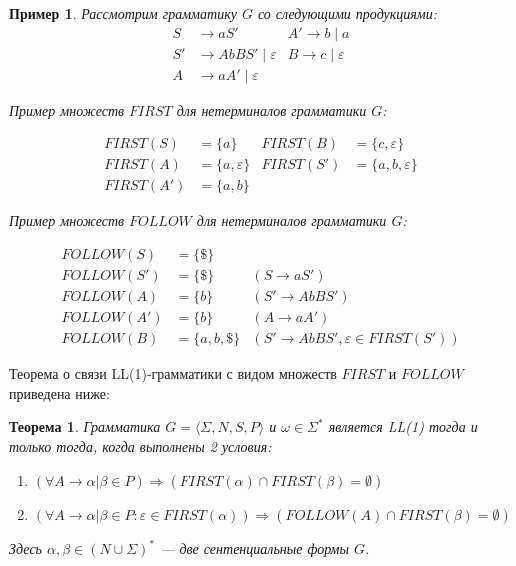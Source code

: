 \documentclass[10pt]{article}         %
\newtheorem{example}{Пример}
\newtheorem{theorem}{Теорема}
\begin{document}
	\begin{example}
		
		Рассмотрим грамматику $G$ со следующими продукциями:
		\begin{align*}
			S  &\to a S' & A' \to b \mid a \\
			S' &\to A b B S' \mid \varepsilon &  B  \to c \mid \varepsilon\\
			A  &\to a A' \mid \varepsilon 
		\end{align*}
		
		
		Пример множеств $FIRST$ для нетерминалов грамматики $G$:
		
		\begin{multicols}{2}
			
			\columnbreak
			
			\begin{align*}
				FIRST(S)  &= \{ a \}  & FIRST(B)  &= \{ c, \varepsilon \} \\
				FIRST(A)  &= \{ a, \varepsilon \} & FIRST(S') &= \{ a, b, \varepsilon \}\\
				FIRST(A') &= \{ a, b \}   
			\end{align*}
		\end{multicols}
		
		Пример множеств $FOLLOW$ для нетерминалов грамматики $G$:
		
		\begin{align*}
			FOLLOW(S)  &= \{ \$ \} & \\
			FOLLOW(S') &= \{ \$ \} &(S \to a S')\\
			FOLLOW(A)  &= \{ b \}  &(S' \to A b B S') \\
			FOLLOW(A') &= \{ b \}  &(A \to a A')\\
			FOLLOW(B)  &= \{ a, b, \$ \} &(S' \to A b B S', \varepsilon \in FIRST(S'))
		\end{align*}
		
	\end{example}
	
	Теорема о связи LL(1)-грамматики с видом множеств $FIRST$ и $FOLLOW$ приведена ниже:
	\begin{theorem}
		Грамматика $G = \langle \Sigma, N, S, P \rangle$ и $\omega \in \Sigma^{*}$ является LL(1) тогда и только тогда, когда выполнены 2 условия:
		\begin{enumerate}
			\item $(\forall A \to \alpha|\beta \in P) \Rightarrow ({FIRST(\alpha)\cap{FIRST(\beta)}}=\emptyset)$ 
			\item $(\forall A \to \alpha|\beta \in P: \varepsilon \in FIRST(\alpha)) \Rightarrow ({FOLLOW(A)\cap{FIRST(\beta)}}=\emptyset)$
		\end{enumerate}
		Здесь $\alpha,\beta \in (N\cup{\Sigma})^*$ --- две сентенциальные формы $G$.
	\end{theorem}
	
\end{document}
